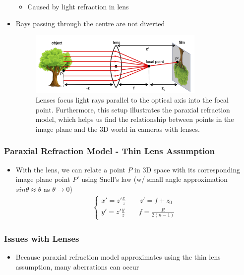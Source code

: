 \documentclass[letterpaper,12pt]{article}
\begin{document}
\begin{itemize}
\begin{itemize}
        \item Caused by light refraction in lens
       \end{itemize}
 \item Rays passing through the centre are not diverted
       \begin{figure}[h!]
        \centering
        \includegraphics[width=0.8\textwidth]{images/parallel_light_ray.png}
        \caption{Lenses focus light rays parallel to the optical axis into the focal point. Furthermore, this setup illustrates the paraxial refraction model, which helps us find the relationship between points in the image plane and the 3D world in cameras with lenses.}
       \end{figure}
\end{itemize}

\subsubsection{Paraxial Refraction Model - Thin Lens Assumption}
\begin{itemize}
 \item With the lens, we can relate a point $P$ in 3D space with its corresponding image plane point $P'$ using Snell's law (w/ small angle approximation $sin\theta \approx \theta$ as $\theta \to 0$)
       \begin{align}
        \begin{cases}
         x' = z' \frac{x}{z} \quad\quad z' = f + z_0 \\
         y' = z' \frac{y}{z} \quad\quad f = \frac{R}{2(n-1)}
        \end{cases}
       \end{align}
\end{itemize}

\subsubsection{Issues with Lenses}
\begin{itemize}
 \item Because paraxial refraction model approximates using the thin lens assumption, many aberrations can occur
\end{itemize}
\end{document}
